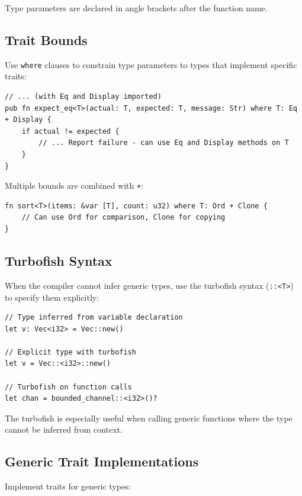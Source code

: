 Type parameters are declared in angle brackets after the function name.

\subsection{Trait Bounds}
\label{subsec:trait-bounds}

Use \texttt{where} clauses to constrain type parameters to types that implement specific traits:

\begin{lstlisting}
// ... (with Eq and Display imported)
pub fn expect_eq<T>(actual: T, expected: T, message: Str) where T: Eq + Display {
    if actual != expected {
        // ... Report failure - can use Eq and Display methods on T
    }
}
\end{lstlisting}

Multiple bounds are combined with \texttt{+}:

\begin{lstlisting}
fn sort<T>(items: &var [T], count: u32) where T: Ord + Clone {
    // Can use Ord for comparison, Clone for copying
}
\end{lstlisting}

\subsection{Turbofish Syntax}
\label{subsec:turbofish}

When the compiler cannot infer generic types, use the turbofish syntax (\texttt{::<T>}) to specify them explicitly:

\begin{lstlisting}
// Type inferred from variable declaration
let v: Vec<i32> = Vec::new()

// Explicit type with turbofish
let v = Vec::<i32>::new()

// Turbofish on function calls
let chan = bounded_channel::<i32>()?
\end{lstlisting}

The turbofish is especially useful when calling generic functions where the type cannot be inferred from context.

\subsection{Generic Trait Implementations}
\label{subsec:generic-impl}

Implement traits for generic types:

